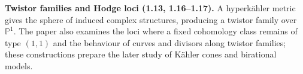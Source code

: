 \documentclass[11pt]{article}
\begin{document}
\par\smallskip\noindent
\textbf{Twistor families and Hodge loci (1.13, 1.16--1.17).}
A hyperk\"ahler metric gives the sphere
of induced complex structures, producing
a twistor family over $\mathbb P^1$.
The paper also examines the loci where
a fixed cohomology class remains of type
$(1,1)$ and the behaviour of curves and
divisors along twistor families; these
constructions prepare the later study
of K\"ahler cones and birational models.
\end{document}
